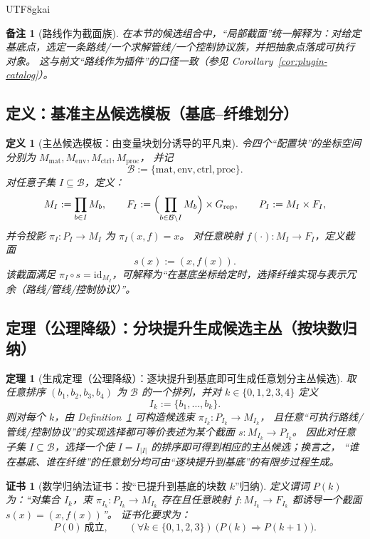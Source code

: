 \documentclass[12pt]{article}
\newtheorem{definition}{定义}[section]
\newtheorem{theorem}{定理}[section]
\newtheorem{remark}{备注}[section]
\newtheorem{certificate}{证书}[section]
\begin{document}
\begin{CJK*}{UTF8}{gkai}
\begin{remark}[路线作为截面族]
在本节的候选组合中，“局部截面”统一解释为：对给定基底点，选定一条路线/一个求解管线/一个控制协议族，并把抽象点落成可执行对象。
这与前文“路线作为插件”的口径一致（参见 Corollary~\ref{cor:plugin-catalog}）。
\end{remark}

\subsection{定义：基准主丛候选模板（基底--纤维划分）}

\begin{definition}[主丛候选模板：由变量块划分诱导的平凡束]
\label{def:rtsc-benchmark-bundle-template}
令四个“配置块”的坐标空间分别为 $M_{\mathrm{mat}},M_{\mathrm{env}},M_{\mathrm{ctrl}},M_{\mathrm{proc}}$，
并记
\[
\mathcal{B}:=\{\mathrm{mat},\mathrm{env},\mathrm{ctrl},\mathrm{proc}\}.
\]
对任意子集 $I\subseteq\mathcal{B}$，定义：
\[
M_I:=\prod_{b\in I} M_b,
\qquad
F_I:=\Bigl(\prod_{b\in \mathcal{B}\setminus I} M_b\Bigr)\times G_{\mathrm{rep}},
\qquad
P_I:=M_I\times F_I,
\]
并令投影 $\pi_I:P_I\to M_I$ 为 $\pi_I(x,f)=x$。
对任意映射 $f(\cdot):M_I\to F_I$，定义截面
\[
s(x):=(x,f(x)).
\]
该截面满足 $\pi_I\circ s=\mathrm{id}_{M_I}$，可解释为“在基底坐标给定时，选择纤维实现与表示冗余（路线/管线/控制协议）”。
\end{definition}

\subsection{定理（公理降级）：分块提升生成候选主丛（按块数归纳）}

\begin{theorem}[生成定理（公理降级）：逐块提升到基底即可生成任意划分主丛候选]
\label{thm:block-lift-generates-bundles}
取任意排序 $(b_1,b_2,b_3,b_4)$ 为 $\mathcal{B}$ 的一个排列，并对 $k\in\{0,1,2,3,4\}$ 定义
\[
I_k:=\{b_1,\ldots,b_k\}.
\]
则对每个 $k$，由 Definition~\ref{def:rtsc-benchmark-bundle-template} 可构造候选束 $\pi_{I_k}:P_{I_k}\to M_{I_k}$，
且任意“可执行路线/管线/控制协议”的实现选择都可等价表述为某个截面 $s:M_{I_k}\to P_{I_k}$。
因此对任意子集 $I\subseteq\mathcal{B}$，选择一个使 $I=I_{|I|}$ 的排序即可得到相应的主丛候选；换言之，
“谁在基底、谁在纤维”的任意划分均可由“逐块提升到基底”的有限步过程生成。
\end{theorem}

\begin{certificate}[数学归纳法证书：按“已提升到基底的块数 $k$”归纳]
\label{cert:block-lift-induction}
定义谓词 $P(k)$ 为：“对集合 $I_k$，束 $\pi_{I_k}:P_{I_k}\to M_{I_k}$ 存在且任意映射 $f:M_{I_k}\to F_{I_k}$ 都诱导一个截面 $s(x)=(x,f(x))$”。
证书化要求为：
\[
P(0)\ \text{成立},\qquad
(\forall k\in\{0,1,2,3\})\ \bigl(P(k)\Rightarrow P(k+1)\bigr).
\]
\end{certificate}


\end{CJK*}
\end{document}
